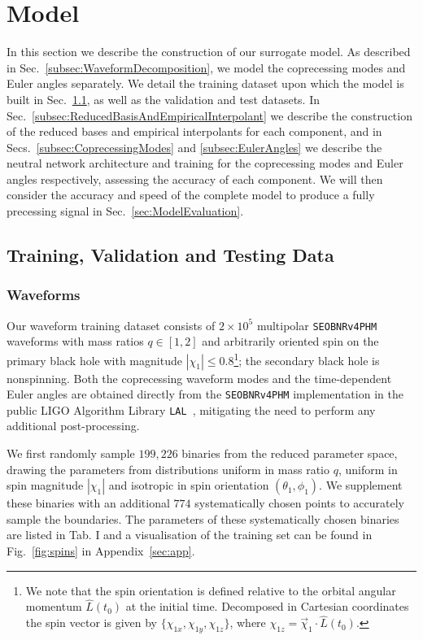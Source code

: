 \documentclass[prd,amssymb,amsmath,amsfonts,superscriptaddress,nofootinbib,reprint,showpacs, longbibliography]{revtex4-1}
\newcommand{\SEOB}{\texttt{SEOBNRv4PHM}}
\begin{document}
\section{Model}
\label{sec:Model}
In this section we describe the construction of our surrogate model. As described in Sec.~\ref{subsec:WaveformDecomposition}, we model the coprecessing modes and Euler angles separately. We detail the training dataset upon which the model is built in Sec.~\ref{subsec:TrainingAndValidationData}, as well as the validation and test datasets. In Sec.~\ref{subsec:ReducedBasisAndEmpiricalInterpolant} we describe the construction of the reduced bases and empirical interpolants for each component, and in Secs.~\ref{subsec:CoprecessingModes} and \ref{subsec:EulerAngles} we describe the neutral network architecture and training for the coprecessing modes and Euler angles respectively, assessing the accuracy of each component. We will then consider the accuracy and speed of the complete model to produce a fully precessing signal in Sec.~\ref{sec:ModelEvaluation}.

\subsection{Training, Validation and Testing Data}
\label{subsec:TrainingAndValidationData}
\subsubsection{Waveforms}
Our waveform training dataset consists of $2 \times 10^5$ multipolar \SEOB{} waveforms with mass ratios $q \in [1,2]$ and arbitrarily oriented spin on the primary black hole with magnitude $|\chi_1| \leq 0.8$\footnote{We note that the spin orientation is defined relative to the orbital angular momentum $\hat{L}(t_0)$ at the initial time. Decomposed in Cartesian coordinates the spin vector is given by $\{\chi_{1x}, \chi_{1y}, \chi_{1z}\}$, where $\chi_{1z} = \vec{\chi}_1 \cdot \hat{L}(t_0)$.}; the secondary black hole is nonspinning.
Both the coprecessing waveform modes and the time-dependent Euler angles are obtained directly from the \SEOB{} implementation in the public LIGO Algorithm Library \texttt{LAL}~\cite{lalsuite}, mitigating the need to perform any additional post-processing.

We first randomly sample $199,226$ binaries from the reduced parameter space, drawing the parameters from distributions uniform in mass ratio $q$, uniform in spin magnitude $|\chi_1|$ and isotropic in spin orientation $(\theta_1, \phi_1)$. We supplement these binaries with an additional $774$ systematically chosen points to accurately sample the boundaries. 
The parameters of these systematically chosen binaries are listed in Tab. I and a visualisation of the training set can be found in Fig.~\ref{fig:spins} in Appendix~\ref{sec:app}. 
\end{document}
